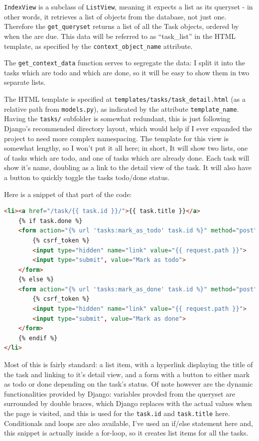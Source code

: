 \documentclass{article}
\begin{document}
\texttt{IndexView} is a subclass of \texttt{ListView},
meaning it expects a list as its queryset -
in other words,
it retrieves a list of objects from the database,
not just one.
Therefore the \texttt{get\_queryset} returns a list of all the Task objects,
ordered by when the are due.
This data will be referred to as ``task\_list'' in the HTML template,
as specified by the \texttt{context\_object\_name} attribute.

The \texttt{get\_context\_data} function serves to segregate the data:
I split it into the tasks which are todo and which are done,
so it will be easy to show them in two separate lists.

The HTML template is specified at \texttt{templates/tasks/task\_detail.html}
(as a relative path from \texttt{models.py}),
as indicated by the attribute \texttt{template\_name}.
Having the \texttt{tasks/} subfolder is somewhat redundant,
this is just following Django's recommended directory layout,
which would help if I ever expanded the project to need more complex namespacing.
The template for this view is somewhat lengthy,
so I won't put it all here;
in short,
It will show two lists,
one of tasks which are todo,
and one of tasks which are already done.
Each task will show it's name,
doubling as a link to the detail view of the task.
It will also have a button to quickly toggle the tasks todo/done status.

Here is a snippet of that part of the code:
\begin{lstlisting}[language=HTML]
<li><a href="/task/{{ task.id }}/">{{ task.title }}</a>
    {% if task.done %}
    <form action="{% url 'tasks:mark_as_todo' task.id %}" method="post">
        {% csrf_token %}
        <input type="hidden" name="link" value="{{ request.path }}">
        <input type="submit", value="Mark as todo">
    </form>
    {% else %}
    <form action="{% url 'tasks:mark_as_done' task.id %}" method="post">
        {% csrf_token %}
        <input type="hidden" name="link" value="{{ request.path }}">
        <input type="submit", value="Mark as done">
    </form>
    {% endif %}
</li>
\end{lstlisting}

Most of this is fairly standard:
a list item,
with a hyperlink displaying the title of the task and linking to it's detail view,
and a form with a button to either mark as todo or done depending on the task's status.
Of note however are the dynamic functionalities provided by Django:
variables provded from the queryset are surrounded by double braces,
which Django replaces with the actual values when the page is visited,
and this is used for the \texttt{task.id} and \texttt{task.title} here.
Conditionals and loops are also available,
I've used an if/else statement here and,
this snippet is actually inside a for-loop,
so it creates list items for all the tasks.
\end{document}
